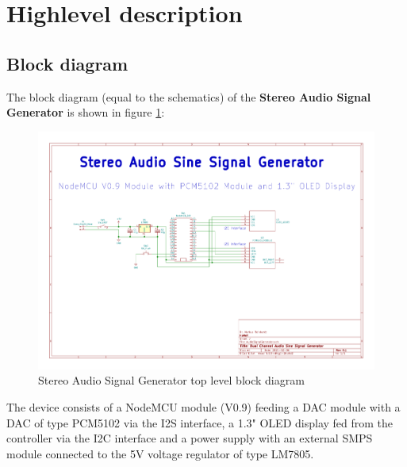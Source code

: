 \documentclass[11pt, oneside]{scrartcl}   	%
\begin{document}
	
	\newpage
	\thispagestyle{empty}
	\tableofcontents
	
	\thispagestyle{empty}
	\listoffigures
	
	\newpage
	\pagestyle{scrheadings}

\section{Highlevel description}
\subsection{Block diagram}                         
The block diagram (equal to the schematics) of the \textbf{Stereo Audio Signal Generator} is shown in figure \ref{fig:toplevelfunctionalblock}:
\begin{figure}[tbph]
	\centering
	\includegraphics[width=\linewidth]{AudioSignalGeneratorSchematics.pdf}
	\caption[Stereo Audio Signal Generator top level block diagram]{Stereo Audio Signal Generator top level block diagram}
	\label{fig:toplevelfunctionalblock}
\end{figure}
The device consists of a NodeMCU module (V0.9) feeding a DAC module with a DAC of type PCM5102 via the I2S interface, a 1.3" OLED display fed from the controller via the I2C interface and a power supply with an external SMPS module connected to the
5V voltage regulator of type LM7805.
\newpage
\end{document}
